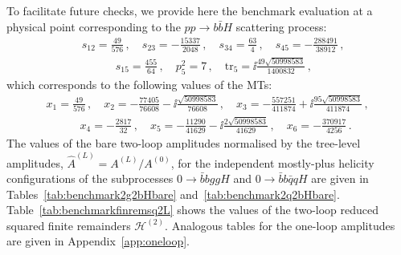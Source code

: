 \documentclass[main.tex]{subfiles}
\begin{document}
To facilitate future checks, we provide here the benchmark evaluation at a physical point corresponding to the $pp \to b\bar{b}H$ scattering process:
\begin{align}
&s_{12}=\frac{49}{576}\,, \quad 
s_{23}=-\frac{15337}{2048}\,, \quad 
s_{34} = \frac{63}{4}\,,\quad  
s_{45} = -\frac{288491}{38912}\,,\nonumber \\[10pt]
& \qquad \quad s_{15} = \frac{455}{64}\,, \quad 
p_5^2 = 7\,, \quad 
\mathrm{tr}_5 = \ii\frac{49\sqrt{50998583}}{1400832}  \,,
\label{eq:physicalpointHbb}
\end{align}
which corresponds to the following values of the MTs:
\begin{align}
&
x_{1}=\frac{49}{576}\,, \quad 
x_{2}=-\frac{77405}{76608}-\ii\frac{\sqrt{50998583}}{76608}\,, \quad
x_{3}=-\frac{557251}{411874}+\ii\frac{95\sqrt{50998583}}{411874}\,, \quad \nonumber \\[10pt]
& \qquad \quad
x_{4}=-\frac{2817}{32}\,,\quad 
x_{5}=-\frac{11290}{41629} - \ii\frac{2\sqrt{50998583}}{41629}\,, \quad 
x_{6}=-\frac{370917}{4256} \,.
\label{eq:physicalpointHbbMomTwistor}
\end{align}
The values of the bare two-loop amplitudes normalised by the tree-level amplitudes,
$\hat{A}^{(L)} = A^{(L)}/A^{(0)}$,
for the independent mostly-plus helicity configurations of the subprocesses $0\to \bar{b} b gg H$ and $0\to \bar{b} b \bar{q} q H$ are given in Tables~\ref{tab:benchmark2g2bHbare} and~\ref{tab:benchmark2q2bHbare}. Table~\ref{tab:benchmarkfinremsq2L} shows the values of the two-loop reduced squared finite remainders $\mathcal{H}^{(2)}$. 
Analogous tables for the one-loop amplitudes are given in Appendix~\ref{app:oneloop}.
\end{document}
